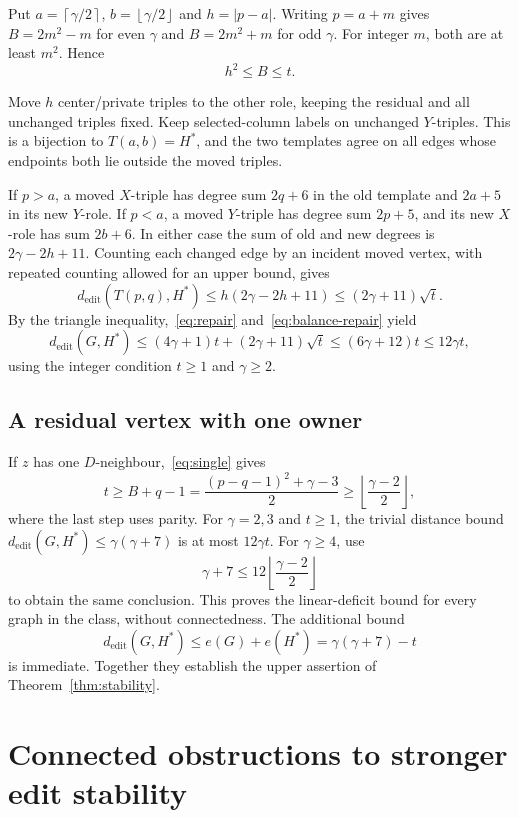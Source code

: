 \documentclass[11pt]{article}
\theoremstyle{definition}
\theoremstyle{remark}
\newcommand{\e}{e}
\newcommand{\ceil}[1]{\left\lceil#1\right\rceil}
\newcommand{\floor}[1]{\left\lfloor#1\right\rfloor}
\begin{document}
Put $a=\ceil{\gamma/2}$, $b=\floor{\gamma/2}$ and $h=|p-a|$.
Writing $p=a+m$ gives $B=2m^2-m$ for even $\gamma$ and $B=2m^2+m$ for
odd $\gamma$. For integer $m$, both are at least $m^2$. Hence
\begin{equation}\label{eq:imbalance-stability}
 h^2\le B\le t.
\end{equation}

Move $h$ center/private triples to the other role, keeping the residual
and all unchanged triples fixed. Keep selected-column labels on
unchanged $Y$-triples. This is a bijection to $T(a,b)=H^*$, and the two
templates agree on all edges whose endpoints both lie outside the
moved triples.

If $p>a$, a moved $X$-triple has degree sum $2q+6$ in the old template
and $2a+5$ in its new $Y$-role. If $p<a$, a moved $Y$-triple has degree
sum $2p+5$, and its new $X$-role has sum $2b+6$. In either case the sum
of old and new degrees is $2\gamma-2h+11$. Counting each changed edge
by an incident moved vertex, with repeated counting allowed for an
upper bound, gives
\begin{equation}\label{eq:balance-repair}
 d_{\mathrm{edit}}(T(p,q),H^*)
 \le h(2\gamma-2h+11)\le(2\gamma+11)\sqrt t.
\end{equation}
By the triangle inequality,~\eqref{eq:repair} and~\eqref{eq:balance-repair}
yield
\[
 d_{\mathrm{edit}}(G,H^*)
 \le(4\gamma+1)t+(2\gamma+11)\sqrt t
 \le(6\gamma+12)t\le12\gamma t,
\]
using the integer condition $t\ge1$ and $\gamma\ge2$.

\subsection{A residual vertex with one owner}

If $z$ has one $D$-neighbour,~\eqref{eq:single} gives
\[
 t\ge B+q-1=\frac{(p-q-1)^2+\gamma-3}{2}
      \ge\floor{\frac{\gamma-2}{2}},
\]
where the last step uses parity. For $\gamma=2,3$ and $t\ge1$, the
trivial distance bound $d_{\mathrm{edit}}(G,H^*)\le\gamma(\gamma+7)$
is at most $12\gamma t$. For $\gamma\ge4$, use
\[
 \gamma+7\le12\floor{\frac{\gamma-2}{2}}
\]
to obtain the same conclusion. This proves the linear-deficit bound
for every graph in the class, without connectedness.
The additional bound
\[
 d_{\mathrm{edit}}(G,H^*)\le\e(G)+\e(H^*)
      =\gamma(\gamma+7)-t
\]
is immediate. Together they establish the upper assertion of
Theorem~\ref{thm:stability}.

\section{Connected obstructions to stronger edit stability}\label{sec:obstruction}
\end{document}
